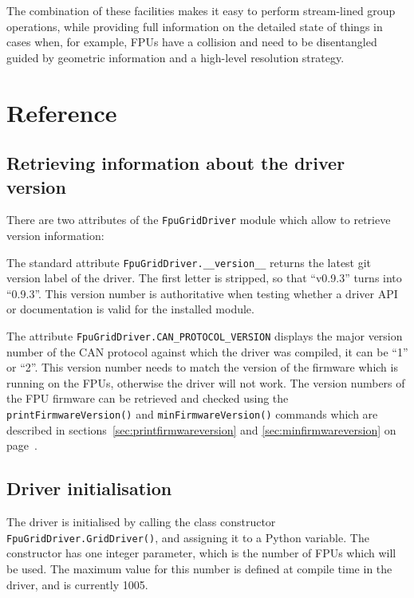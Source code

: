 \documentclass[11pt,a4paper]{scrartcl}
\begin{document}
The combination of these facilities makes it easy to perform
stream-lined group operations, while providing full information on the
detailed state of things in cases when, for example, FPUs have a
collision and need to be disentangled guided by geometric information
and a high-level resolution strategy.



\section{Reference}

\subsection{Retrieving information about the driver version}
There are two attributes of the \texttt{FpuGridDriver} module
which allow to retrieve version information:

The standard attribute \texttt{FpuGridDriver.\_\_version\_\_} returns
the latest git version label of the driver. The first letter is stripped, so
that ``v0.9.3'' turns into ``0.9.3''. This version number is
authoritative when testing whether a driver API or documentation is
valid for the installed module.

The attribute \texttt{FpuGridDriver.CAN\_PROTOCOL\_VERSION} displays
the major version number of the CAN protocol against which the driver
was compiled, it can be ``1'' or ``2''. This version number needs to
match the version of the firmware which is running on the FPUs,
otherwise the driver will not work. The version numbers of the FPU
firmware can be retrieved and checked using the
\texttt{printFirmwareVersion()} and \texttt{minFirmwareVersion()}
commands which are described in
sections~\ref{sec:printfirmwareversion} and
\ref{sec:minfirmwareversion} on
page~\pageref{sec:printfirmwareversion}.


\subsection{Driver initialisation}
The driver is initialised by calling the class constructor
\texttt{FpuGridDriver.GridDriver()}, and assigning it to a Python
variable. The constructor has one integer parameter, which is the
number of FPUs which will be used. The maximum value for this number
is defined at compile time in the driver, and is currently 1005.
\end{document}
